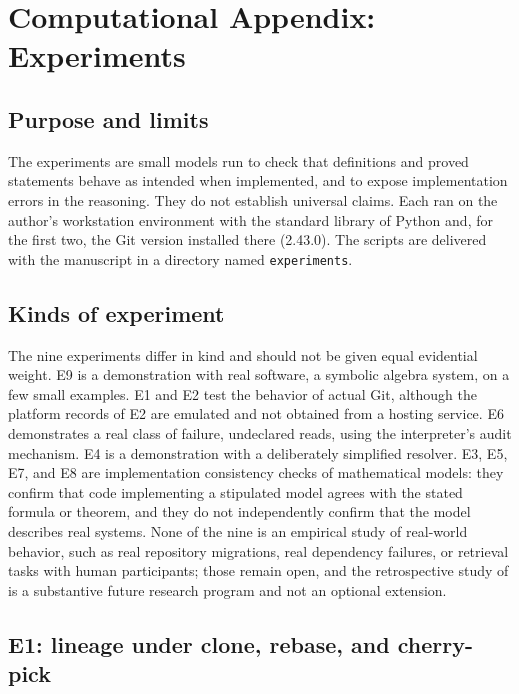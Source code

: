 \documentclass[11pt,twoside,openright]{book}
\theoremstyle{plain}
\theoremstyle{definition}
\theoremstyle{remark}
\begin{document}
\chapter{Computational Appendix: Experiments}\label{app:experiments}

\section{Purpose and limits}

The experiments are small models run to check that definitions and proved statements behave as intended when implemented, and to expose implementation errors in the reasoning. They do not establish universal claims. Each ran on the author's workstation environment with the standard library of Python and, for the first two, the Git version installed there (2.43.0). The scripts are delivered with the manuscript in a directory named \texttt{experiments}.

\section{Kinds of experiment}

The nine experiments differ in kind and should not be given equal evidential weight. E9 is a demonstration with real software, a symbolic algebra system, on a few small examples. E1 and E2 test the behavior of actual Git, although the platform records of E2 are emulated and not obtained from a hosting service. E6 demonstrates a real class of failure, undeclared reads, using the interpreter's audit mechanism. E4 is a demonstration with a deliberately simplified resolver. E3, E5, E7, and E8 are implementation consistency checks of mathematical models: they confirm that code implementing a stipulated model agrees with the stated formula or theorem, and they do not independently confirm that the model describes real systems. None of the nine is an empirical study of real-world behavior, such as real repository migrations, real dependency failures, or retrieval tasks with human participants; those remain open, and the retrospective study of  is a substantive future research program and not an optional extension.

\section{E1: lineage under clone, rebase, and cherry-pick}
\end{document}
